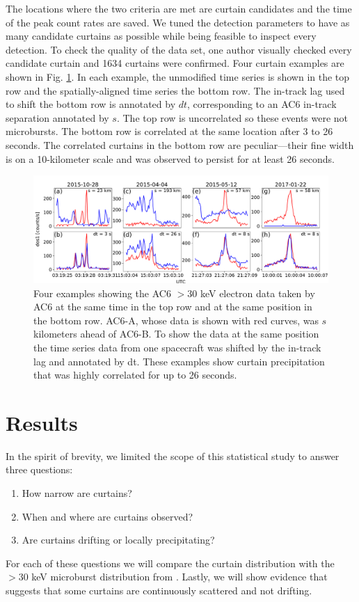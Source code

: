 \documentclass[draft]{agujournal2019}
\begin{document}
The locations where the two criteria are met are curtain candidates and the time of the peak count rates are saved. We tuned the detection parameters to have as many candidate curtains as possible while being feasible to inspect every detection. To check the quality of the data set, one author visually checked every candidate curtain and 1634 curtains were confirmed. Four curtain examples are shown in Fig. \ref{fig1}. In each example, the unmodified time series is shown in the top row and the spatially-aligned time series the bottom row. The in-track lag used to shift the bottom row is annotated by $dt$, corresponding to an AC6 in-track separation annotated by $s$. The top row is uncorrelated so these events were not microbursts. The bottom row is correlated at the same location after 3 to 26 seconds. The correlated curtains in the bottom row are peculiar---their fine width is on a 10-kilometer scale and was observed to persist for at least 26 seconds.

\begin{figure}
\includegraphics[width=\textwidth]{fig1.pdf}
\caption{Four examples showing the AC6 $> 30$ keV electron data taken by AC6 at the same time in the top row and at the same position in the bottom row. AC6-A, whose data is shown with red curves, was $s$ kilometers ahead of AC6-B. To show the data at the same position the time series data from one spacecraft was shifted by the in-track lag and annotated by dt. These examples show curtain precipitation that was highly correlated for up to 26 seconds.}
\label{fig1}
\end{figure}

\section{Results} \label{results}
In the spirit of brevity, we limited the scope of this statistical study to answer three questions:

\begin{enumerate}
\item How narrow are curtains?
\item When and where are curtains observed?
\item Are curtains drifting or locally precipitating?
\end{enumerate} For each of these questions we will compare the curtain distribution with the $>30$ keV microburst distribution from . Lastly, we will show evidence that suggests that some curtains are continuously scattered and not drifting.
\end{document}

